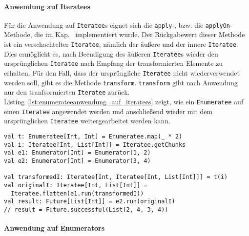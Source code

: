 \documentclass[draft=false
              ,paper=a4
              ,twoside=false
              ,fontsize=11pt
              ,headsepline
              ,BCOR10mm
              ,DIV11
              ]{scrbook}
\begin{document}


\paragraph{Anwendung auf Iteratees} %
\label{par:enumerateeanwendung_auf_iteratees}\mbox{} %

Für die Anwendung auf \lstinline|Iteratee|s eignet sich die \lstinline|apply|-, bzw. die \lstinline|applyOn|-Methode, die im Kap.~ implementiert wurde.
Der Rückgabewert dieser Methode ist ein verschachtelter \lstinline|Iteratee|, nämlich der äußere und der innere \lstinline|Iteratee|.
Dies ermöglicht es, nach Beendigung des äußeren \lstinline|Iteratee|s wieder den ursprünglichen \lstinline|Iteratee| nach Empfang der transformierten Elemente zu erhalten.
Für den Fall, dass der ursprüngliche \lstinline|Iteratee| nicht wiederverwendet werden soll, gibt es die Methode \lstinline|transform|.
\lstinline|transform| gibt nach Anwendung nur den tranfsormierten \lstinline|Iteratee| zurück.
Listing~\ref{lst:enumerateeanwendung_auf_iteratees} zeigt, wie ein \lstinline|Enumeratee| auf einen \lstinline|Iteratee| angewendet werden und anschließend wieder mit dem ursprünglichen \lstinline|Iteratee| weitergearbeitet werden kann.

\begin{lstlisting}[caption=Enumerateeanwendung auf Iteratees, label=lst:enumerateeanwendung_auf_iteratees]
val t: Enumeratee[Int, Int] = Enumeratee.map(_ * 2)
val i: Iteratee[Int, List[Int]] = Iteratee.getChunks
val e1: Enumerator[Int] = Enumerator(1, 2)
val e2: Enumerator[Int] = Enumerator(3, 4)

val transformedI: Iteratee[Int, Iteratee[Int, List[Int]]] = t(i)
val originalI: Iteratee[Int, List[Int]] =
  Iteratee.flatten(e1.run(transformedI))
val result: Future[List[Int]] = e2.run(originalI)
// result = Future.successful(List(2, 4, 3, 4))
\end{lstlisting}


\paragraph{Anwendung auf Enumerators} %
\label{par:enumerateeanwendung_auf_enumerators}\mbox{} %
\end{document}
